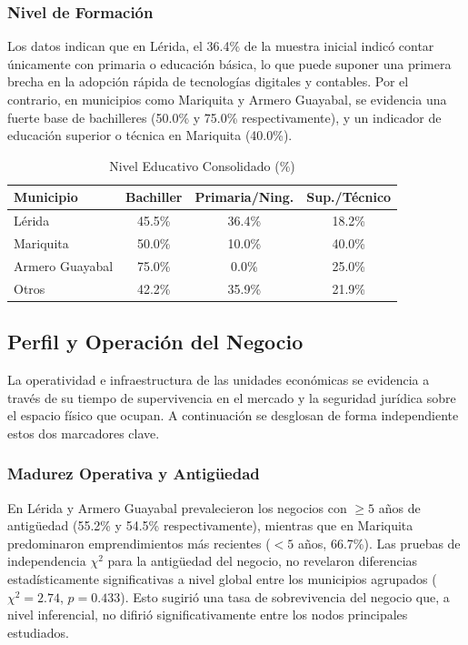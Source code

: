 \documentclass[11pt,a4paper]{article}
\begin{document}
\subsubsection{Nivel de Formaci\'on}
Los datos indican que en Lérida, el 36.4\% de la muestra inicial indicó contar únicamente con primaria o educación básica, lo que puede suponer una primera brecha en la adopción rápida de tecnologías digitales y contables. Por el contrario, en municipios como Mariquita y Armero Guayabal, se evidencia una fuerte base de bachilleres (50.0\% y 75.0\% respectivamente), y un indicador de educación superior o técnica en Mariquita (40.0\%).

\begin{table}[H]
\centering
\caption{Nivel Educativo Consolidado (\%)}
\small
\begin{tabular}{@{}lccc@{}}
\toprule
Municipio         & Bachiller   & Primaria/Ning.   & Sup./Técnico \\ \midrule
Lérida              & 45.5\%         & 36.4\%           & 18.2\% \\
Mariquita           & 50.0\%         & 10.0\%           & 40.0\% \\
Armero Guayabal     & 75.0\%          & 0.0\%           & 25.0\% \\
Otros               & 42.2\%         & 35.9\%           & 21.9\% \\ \bottomrule
\end{tabular}
\end{table}

\subsection{Perfil y Operaci\'on del Negocio}
La operatividad e infraestructura de las unidades económicas se evidencia a través de su tiempo de supervivencia en el mercado y la seguridad jurídica sobre el espacio físico que ocupan. A continuación se desglosan de forma independiente estos dos marcadores clave.

\subsubsection{Madurez Operativa y Antig\"uedad}
En Lérida y Armero Guayabal prevalecieron los negocios con $\geq 5$ años de antigüedad (55.2\% y 54.5\% respectivamente), mientras que en Mariquita predominaron emprendimientos más recientes ($< 5$ años, 66.7\%). Las pruebas de independencia $\chi^{2}$ para la antigüedad del negocio, no revelaron diferencias estadísticamente significativas a nivel global entre los municipios agrupados ($\chi^{2} = 2.74$, $p = 0.433$). Esto sugirió una tasa de sobrevivencia del negocio que, a nivel inferencial, no difirió significativamente entre los nodos principales estudiados.
\end{document}

